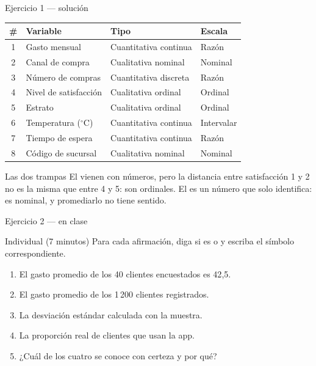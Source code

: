 \documentclass[aspectratio=169,10pt]{beamer}
\begin{document}
\begin{frame}{Ejercicio 1 — solución}
  \scriptsize
  \begin{center}
  \begin{tabular}{@{}clll@{}}
    \toprule
    \textbf{\#} & \textbf{Variable} & \textbf{Tipo} & \textbf{Escala} \\
    \midrule
    1 & Gasto mensual        & Cuantitativa continua & Razón \\
    2 & Canal de compra      & Cualitativa nominal   & Nominal \\
    3 & Número de compras    & Cuantitativa discreta & Razón \\
    4 & Nivel de satisfacción& Cualitativa ordinal   & Ordinal \\
    5 & Estrato              & Cualitativa ordinal   & Ordinal \\
    6 & Temperatura ($^\circ$C) & Cuantitativa continua & Intervalar \\
    7 & Tiempo de espera     & Cuantitativa continua & Razón \\
    8 & Código de sucursal   & Cualitativa nominal   & Nominal \\
    \bottomrule
  \end{tabular}
  \end{center}

  \vspace{0.2cm}
  \begin{alertblock}{Las dos trampas}
    \footnotesize
    El  vienen con números, pero la distancia entre
    satisfacción 1 y 2 no es la misma que entre 4 y 5: son ordinales. El
     es un número que solo identifica: es nominal, y promediarlo no
    tiene sentido.
  \end{alertblock}
\end{frame}

\begin{frame}{Ejercicio 2 — en clase}
  \begin{alertblock}{Individual (7 minutos)}
    Para cada afirmación, diga si es  o  y
    escriba el símbolo correspondiente.

    \vspace{0.25cm}
    \begin{enumerate}
      \item El gasto promedio de los 40 clientes encuestados es 42{,}5.
      \item El gasto promedio de los 1\,200 clientes registrados.
      \item La desviación estándar calculada con la muestra.
      \item La proporción real de clientes que usan la app.
      \item ¿Cuál de los cuatro se conoce con certeza y por qué?
    \end{enumerate}
  \end{alertblock}
\end{frame}
\end{document}
